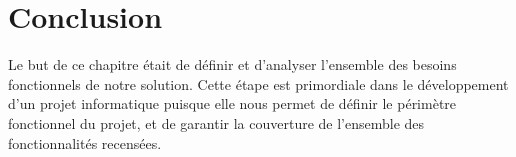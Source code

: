 \FloatBarrier

\section{Conclusion}
Le but de ce chapitre était de définir et d’analyser l’ensemble des besoins fonctionnels  de notre solution. Cette étape est primordiale dans le développement d’un projet informatique puisque elle nous permet de définir le périmètre fonctionnel du projet, et de garantir la couverture de l’ensemble des fonctionnalités recensées.
